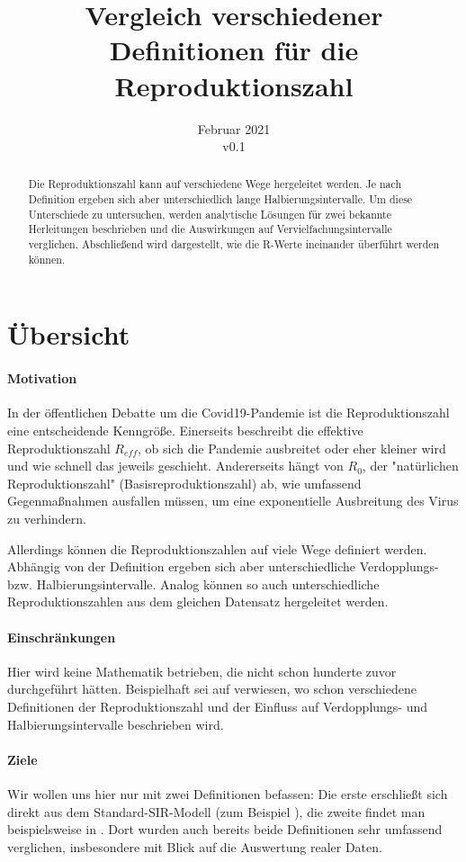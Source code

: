 \documentclass[a4paper]{article}
\title{Vergleich verschiedener Definitionen für die Reproduktionszahl}
\date{Februar 2021 \\ v0.1}
\begin{document}
    
    \maketitle
    \begin{abstract}
        Die Reproduktionszahl kann auf verschiedene Wege hergeleitet werden. Je nach Definition ergeben sich aber unterschiedlich lange Halbierungsintervalle. Um diese Unterschiede zu untersuchen, werden analytische Lösungen für zwei bekannte Herleitungen beschrieben und die Auswirkungen auf Vervielfachungsintervalle verglichen. Abschließend wird dargestellt, wie die R-Werte ineinander überführt werden können.
    \end{abstract}

    \section{Übersicht}
    \paragraph{Motivation}In der öffentlichen Debatte um die Covid19-Pandemie ist die Reproduktionszahl eine entscheidende Kenngröße. Einerseits beschreibt die effektive Reproduktionszahl $R_{eff}$, ob sich die Pandemie ausbreitet oder eher kleiner wird und wie schnell das jeweils geschieht. Andererseits hängt von $R_0$, der "natürlichen Reproduktionszahl" (Basisreproduktionszahl) ab, wie umfassend Gegenmaßnahmen ausfallen müssen, um eine exponentielle Ausbreitung des Virus zu verhindern. 
    
    Allerdings können die Reproduktionszahlen auf viele Wege definiert werden. Abhängig von der Definition ergeben sich aber unterschiedliche Verdopplungs- bzw. Halbierungsintervalle. Analog können so auch unterschiedliche Reproduktionszahlen aus dem gleichen Datensatz hergeleitet werden.

    \paragraph{Einschränkungen}Hier wird keine Mathematik betrieben, die nicht schon hunderte zuvor durchgeführt hätten. Beispielhaft sei auf \cite{generationTime} verwiesen, wo schon verschiedene Definitionen der Reproduktionszahl und der Einfluss auf Verdopplungs- und Halbierungsintervalle beschrieben wird.

    \paragraph{Ziele}Wir wollen uns hier nur mit zwei Definitionen befassen: Die erste erschließt sich direkt aus dem Standard-SIR-Modell (zum Beispiel \cite{jonesOnR0}), die zweite findet man beispielsweise in \cite{dehning}. Dort wurden auch bereits beide Definitionen sehr umfassend verglichen, insbesondere mit Blick auf die Auswertung realer Daten. 
\end{document}
